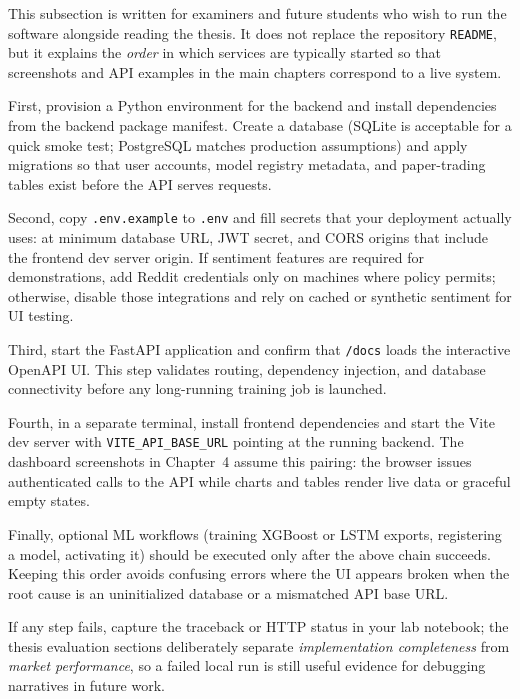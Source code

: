 This subsection is written for examiners and future students who wish to run the software alongside reading the thesis. It does not replace the repository \texttt{README}, but it explains the \emph{order} in which services are typically started so that screenshots and API examples in the main chapters correspond to a live system.

First, provision a Python environment for the backend and install dependencies from the backend package manifest. Create a database (SQLite is acceptable for a quick smoke test; PostgreSQL matches production assumptions) and apply migrations so that user accounts, model registry metadata, and paper-trading tables exist before the API serves requests.

Second, copy \texttt{.env.example} to \texttt{.env} and fill secrets that your deployment actually uses: at minimum database URL, JWT secret, and CORS origins that include the frontend dev server origin. If sentiment features are required for demonstrations, add Reddit credentials only on machines where policy permits; otherwise, disable those integrations and rely on cached or synthetic sentiment for UI testing.

Third, start the FastAPI application and confirm that \texttt{/docs} loads the interactive OpenAPI UI. This step validates routing, dependency injection, and database connectivity before any long-running training job is launched.

Fourth, in a separate terminal, install frontend dependencies and start the Vite dev server with \texttt{VITE\_API\_BASE\_URL} pointing at the running backend. The dashboard screenshots in Chapter~4 assume this pairing: the browser issues authenticated calls to the API while charts and tables render live data or graceful empty states.

Finally, optional ML workflows (training XGBoost or LSTM exports, registering a model, activating it) should be executed only after the above chain succeeds. Keeping this order avoids confusing errors where the UI appears broken when the root cause is an uninitialized database or a mismatched API base URL.

If any step fails, capture the traceback or HTTP status in your lab notebook; the thesis evaluation sections deliberately separate \emph{implementation completeness} from \emph{market performance}, so a failed local run is still useful evidence for debugging narratives in future work.

